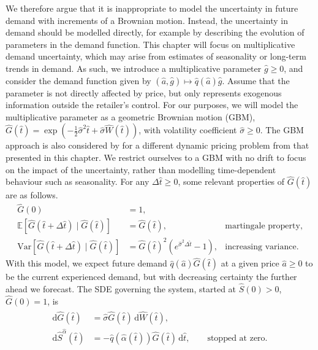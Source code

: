 \documentclass[main.tex]{subfiles}
\begin{document}
We therefore argue that it is inappropriate to model the uncertainty
in future demand with increments of a Brownian motion. Instead, the
uncertainty in demand should be modelled directly,
for example by describing the evolution of parameters in the
demand function.
This chapter will focus on multiplicative demand
uncertainty, which may arise from estimates of seasonality or
long-term trends in demand. As such, we introduce a multiplicative
parameter $\hat{g}\geq 0$, and consider the demand function given by
$({\hat{a}},\hat{g})\mapsto \hat{q}(\hat{a})\hat{g}$.
Assume that the parameter is not directly
affected by price, but  only represents exogenous information outside the
retailer's control.
For our purposes, we will model the multiplicative parameter as
a geometric Brownian motion (GBM), $\hat{G}(\hat{t}) = \exp\left(
  -\frac{1}{2}\hat{\sigma}^2\hat{t} +\hat{\sigma} \hat{W}(\hat{t})\right)$, with volatility coefficient
$\hat{\sigma}\geq 0$. The GBM approach is also considered
by \citet{xu2006monopolistic} for a different dynamic pricing problem from
that presented in this chapter.
We restrict ourselves to a GBM with no
drift to focus on the impact of the uncertainty, rather than modelling
time-dependent behaviour such as seasonality.
For any $\Delta{\hat{t}}\geq 0$, some relevant properties of $\hat{G}(\hat{t})$ are as follows.
\begin{align}
  \hat{G}(0)
  &=1,\\
  \mathbb{E}[\hat{G}(\hat{t}+\Delta{\hat{t}})\mid \hat{G}(\hat{t})]
  &=\hat{G}(\hat{t}),
  &\text{martingale property,}\\
  \mbox{Var}[\hat{G}(\hat{t}+\Delta{\hat{t}})\mid
  \hat{G}(\hat{t})]&={\hat{G}(\hat{t})}^2(e^{\hat{\sigma}^2
                     \Delta{\hat{t}}}-1), & \text{increasing variance.}
\end{align}
With this model, we expect future demand $\hat{q}(\hat{a})\hat{G}(\hat{t})$ at a given price $\hat{a}\geq
0$ to be the current experienced demand, but with decreasing certainty
the further ahead we forecast.
The SDE governing the system, started at
$\hat{S}(0)>0$, $\hat{G}(0)=1$, is
\begin{align}
  \begin{split}\label{eq:gbm_sde}
    \mathrm{d}\hat{G}(\hat{t})&=\hat{\sigma} \hat{G}(\hat{t})\,\mathrm{d}\hat{W}(\hat{t}),\\
    \mathrm{d}\hat{S}^{\hat{\alpha}}(\hat{t})&=-\hat{q}(\hat{\alpha}(\hat{t}))\hat{G}(\hat{t})\,
    \mathrm{d}\hat{t},\qquad\text{stopped at zero}.
  \end{split}
\end{align}
\end{document}
